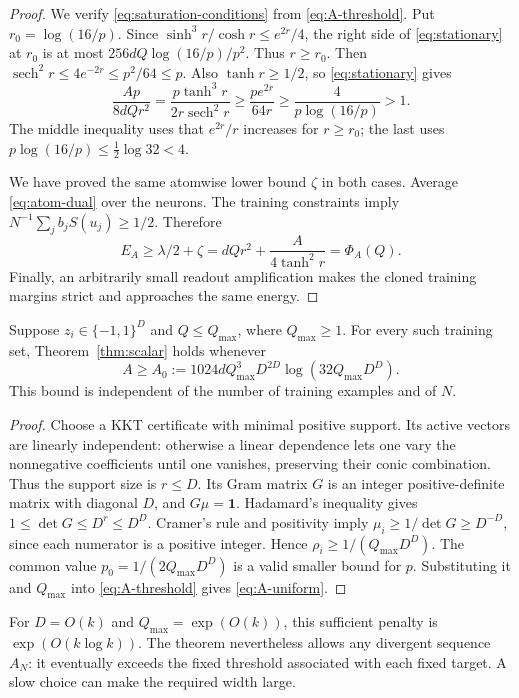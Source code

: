 \begin{proof}
We verify \eqref{eq:saturation-conditions} from \eqref{eq:A-threshold}.
Put $r_0=\log(16/p)$. Since
$\sinh^3r/\cosh r\le e^{2r}/4$, the right side of
\eqref{eq:stationary} at $r_0$ is at most
$256dQ\log(16/p)/p^2$. Thus $r\ge r_0$.
Then $\operatorname{sech}^2r\le4e^{-2r}\le p^2/64\le p$.
Also $\tanh r\ge1/2$, so \eqref{eq:stationary} gives
\[
 \frac{Ap}{8dQr^2}
 =\frac{p\tanh^3r}{2r\operatorname{sech}^2r}
 \ge\frac{pe^{2r}}{64r}
 \ge\frac4{p\log(16/p)}>1.
\]
The middle inequality uses that $e^{2r}/r$ increases for $r\ge r_0$;
the last uses $p\log(16/p)\le\tfrac12\log32<4$.

We have proved the same atomwise lower bound $\zeta$ in both cases.
Average \eqref{eq:atom-dual} over the neurons. The training constraints
imply $N^{-1}\sum_j b_jS(u_j)\ge1/2$. Therefore
\[
 E_A\ge\lambda/2+\zeta
 =dQr^2+\frac A{4\tanh^2r}=\Phi_A(Q).
\]
Finally, an arbitrarily small readout amplification makes the cloned
training margins strict and approaches the same energy.
\end{proof}

\begin{corollary}\label{cor:uniform-A}
Suppose $z_i\in\{-1,1\}^D$ and $Q\le Q_{\max}$, where $Q_{\max}\ge1$.
For every such training set, Theorem~\ref{thm:scalar} holds whenever
\begin{equation}\label{eq:A-uniform}
 A\ge A_0:=1024dQ_{\max}^3D^{2D}
                  \log(32Q_{\max}D^D).
\end{equation}
This bound is independent of the number of training examples and of $N$.
\end{corollary}
\begin{proof}
Choose a KKT certificate with minimal positive support. Its active
vectors are linearly independent: otherwise a linear dependence lets
one vary the nonnegative coefficients until one vanishes, preserving
their conic combination. Thus the support size is $r\le D$.
Its Gram matrix $G$ is an integer positive-definite matrix with diagonal
$D$, and $G\mu=\mathbf1$. Hadamard's inequality gives
$1\le\det G\le D^r\le D^D$. Cramer's rule and positivity imply
$\mu_i\ge1/\det G\ge D^{-D}$, since each numerator is a positive
integer. Hence $\rho_i\ge1/(Q_{\max}D^D)$.
The common value $p_0=1/(2Q_{\max}D^D)$ is a valid smaller bound for $p$.
Substituting it and $Q_{\max}$ into \eqref{eq:A-threshold} gives
\eqref{eq:A-uniform}.
\end{proof}

For $D=O(k)$ and $Q_{\max}=\exp(O(k))$, this sufficient penalty is
$\exp(O(k\log k))$. The theorem nevertheless allows any divergent
sequence $A_N$: it eventually exceeds the fixed threshold associated
with each fixed target. A slow choice can make the required width large.
